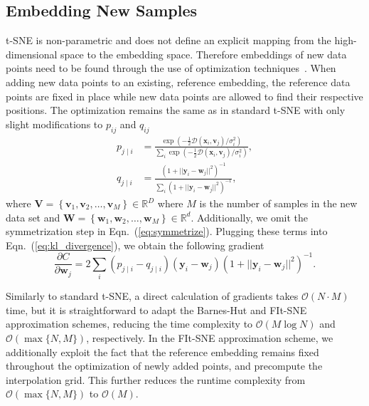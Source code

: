 \documentclass[twocolumn]{bmcart}
\newcommand{\opentsne}{\textsf{openTSNE}}
\begin{document}

\subsection*{Embedding New Samples}

t-SNE is non-parametric and does not define an explicit mapping from the
high-dimensional space to the embedding space. Therefore embeddings of new data
points need to be found through the use of optimization
techniques~\cite{policar2019embedding}. When adding new data points to an
existing, reference embedding, the reference data points are fixed in place while
new data points are allowed to find their respective positions. The
optimization remains the same as in standard t-SNE with only slight
modifications to $p_{ij}$ and $q_{ij}$
\begin{align}
p_{j \mid i} &= \frac{\exp \left ( -\frac{1}{2} \mathcal{D}(\mathbf{x}_i, \mathbf{v}_j) /  \sigma_i^2 \right )}{\sum_{i} \exp \left ( -\frac{1}{2} \mathcal{D}(\mathbf{x}_i, \mathbf{v}_j) / \sigma_i^2 \right )}, \\
q_{j \mid i} &= \frac{\left ( 1 + || \mathbf{y}_i - \mathbf{w}_j ||^2 \right )^{-1}}{\sum_{i}\left ( 1 + || \mathbf{y}_i - \mathbf{w}_j ||^2 \right )^{-1}},
\end{align}
\noindent where $\mathbf{V} = \left \{ \mathbf{v}_1, \mathbf{v}_2, \dots,
\mathbf{v}_M \right \} \in \mathbb{R}^D$ where $M$ is the number of samples in
the new data set and $\mathbf{W} = \left \{ \mathbf{w}_1, \mathbf{w}_2, \dots,
\mathbf{w}_M \right \} \in \mathbb{R}^d$. Additionally, we omit the
symmetrization step in Eqn.~(\ref{eq:symmetrize}).
Plugging these terms into Eqn.~(\ref{eq:kl_divergence}), we obtain the following
gradient
\begin{equation}
\frac{\partial C}{\partial \mathbf{w}_j} = 2 \sum_i \left ( p_{j \mid i} - q_{j \mid i} \right ) \left ( \mathbf{y}_i - \mathbf{w}_j \right ) \left ( 1 + || \mathbf{y}_i - \mathbf{w}_j || ^2 \right )^{-1}.
\label{eq:gradient}
\end{equation}

Similarly to standard t-SNE, a direct calculation of gradients takes $\mathcal{O}(N
\cdot M)$ time, but it is straightforward to adapt the Barnes-Hut and FIt-SNE
approximation schemes, reducing the time complexity to $\mathcal{O}(M \log N)$
and $\mathcal{O}(\max \{ N, M \})$, respectively. In the FIt-SNE approximation
scheme, we additionally exploit the fact that the reference embedding remains
fixed throughout the optimization of newly added points, and precompute the
interpolation grid. This further reduces the runtime complexity from
$\mathcal{O}(\max \{ N, M \})$ to $\mathcal{O}(M)$.
\end{document}
